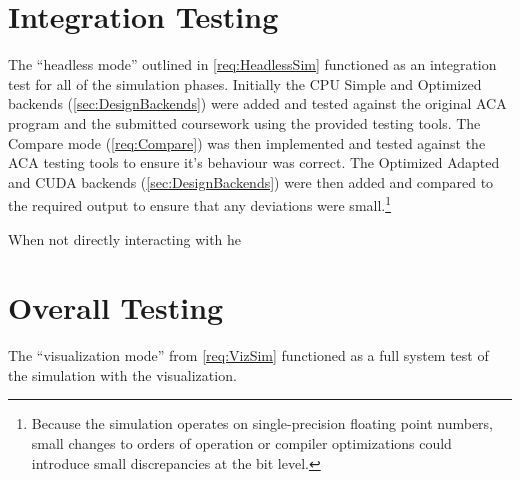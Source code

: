 \section{Integration Testing}
The ``headless mode'' outlined in \cref{req:HeadlessSim} functioned as an integration test for all of the simulation phases.
Initially the CPU Simple and Optimized backends (\cref{sec:DesignBackends}) were added and tested against the original ACA program\cite{modules:CS257Coursework} and the submitted coursework\cite{modules:aca257submission} using the provided testing tools.
The Compare mode (\cref{req:Compare}) was then implemented and tested against the ACA testing tools to ensure it's behaviour was correct.
The Optimized Adapted and CUDA backends (\cref{sec:DesignBackends}) were then added and compared to the required output to ensure that any deviations were small.\footnote{Because the simulation operates on single-precision floating point numbers, small changes to orders of operation or compiler optimizations could introduce small discrepancies at the bit level.}

When not directly interacting with he

\section{Overall Testing}
The ``visualization mode'' from \cref{req:VizSim} functioned as a full system test of the simulation with the visualization.

